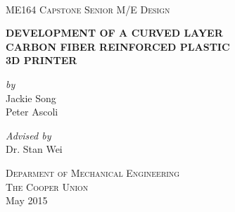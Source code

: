 \begin{titlepage}
\center 

\hfill\\
\vspace{2cm}
\textsc{\LARGE ME164 Capstone Senior M/E Design} \\ 

\vspace{2.5cm} 

{\huge \textbf{DEVELOPMENT OF A CURVED LAYER \\[0pt] CARBON FIBER REINFORCED PLASTIC \\[10pt] 3D PRINTER}}\\[0.4cm] %

\vspace{1.5cm} 
 
\large
\emph{by} \\
Jackie Song \\
Peter Ascoli

\vspace{1cm}

\large
\emph{Advised by} \\
Dr. Stan Wei 

\vspace{1.5cm} 

\textsc{\Large Deparment of Mechanical Engineering} \\
\textsc{\large The Cooper Union} \\
{\large May 2015} \\
\vfill 

\end{titlepage}
